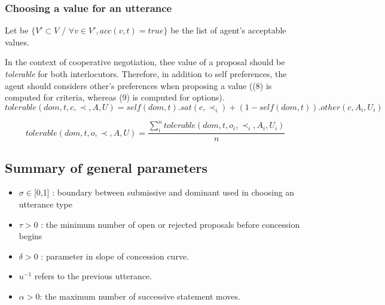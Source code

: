 \documentclass{llncs}
\begin{document}
	
	\subsubsection{Choosing a value for an utterance} 
	
	Let be	$\{V' \subset V$ / $\forall v \in V', acc(v,t) = true\}$ be the list of agent's acceptable values. 
	
	In the context of cooperative negotiation, thee value of a proposal should be \textit{tolerable} for both interlocutors. Therefore, in addition to self preferences, the agent should considers other's preferences when proposing a value ((8) is computed for criteria, whereas (9) is computed for options). 	
	\begin{equation}
	tolerable(dom, t, c, \prec, A, U) = self(dom, t) . sat(c, \prec_i)  +  (1 - self(dom, t)) . other(c, A_i, U_i)
	\end{equation}
	
	\begin{equation}
	tolerable(dom, t, o, \prec, A, U) = \frac{ \sum_{i}^{n} tolerable(dom, t, o_i, \prec_i, A_i, U_i) } {n}
	\end{equation}
	
	\subsection{Summary of general parameters }
	\begin{itemize}[noitemsep]
	
	\item $\sigma \in $[0,1] : boundary between submissive and dominant used in
	choosing an utterance type
	\item $\tau > 0$ : the minimum number of open or rejected proposals before concession begins
	\item $\delta > 0$ : parameter in slope of concession curve.
	\item $u^{-1}$ refers to the previous utterance.
	\item $\alpha> 0$: the maximum number of successive statement moves.
	
	
	\end{itemize}
	
\end{document}
